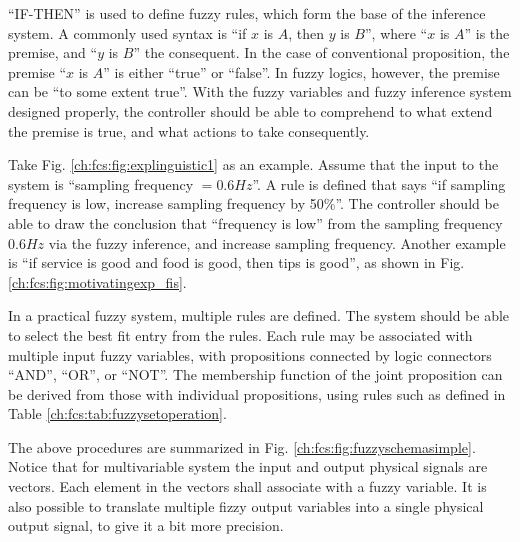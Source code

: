 ``IF-THEN'' is used to define fuzzy rules, which form the base of the inference system. A commonly used syntax is ``if $x$ is $A$, then $y$ is $B$'', where ``$x$ is $A$'' is the premise, and ``$y$ is $B$'' the consequent. In the case of conventional proposition, the premise ``$x$ is $A$'' is either ``true'' or ``false''. In fuzzy logics, however, the premise can be ``to some extent true''. With the fuzzy variables and fuzzy inference system designed properly, the controller should be able to comprehend to what extend the premise is true, and what actions to take consequently.

Take Fig. \ref{ch:fcs:fig:explinguistic1} as an example. Assume that the input to the system is ``sampling frequency $=0.6Hz$''. A rule is defined that says ``if sampling frequency is low, increase sampling frequency by 50\%''. The controller should be able to draw the conclusion that ``frequency is low'' from the sampling frequency $0.6Hz$ via the fuzzy inference, and increase sampling frequency. Another example is ``if service is good and food is good, then tips is good'', as shown in Fig. \ref{ch:fcs:fig:motivatingexp_fis}.

In a practical fuzzy system, multiple rules are defined. The system should be able to select the best fit entry from the rules. Each rule may be associated with multiple input fuzzy variables, with propositions connected by logic connectors ``AND'', ``OR'', or ``NOT''. The membership function of the joint proposition can be derived from those with individual propositions, using rules such as defined in Table \ref{ch:fcs:tab:fuzzysetoperation}.

The above procedures are summarized in Fig. \ref{ch:fcs:fig:fuzzyschemasimple}. Notice that for multivariable system the input and output physical signals are vectors. Each element in the vectors shall associate with a fuzzy variable. It is also possible to translate multiple fizzy output variables into a single physical output signal, to give it a bit more precision.












